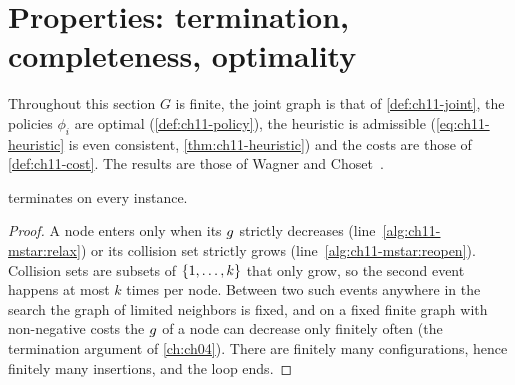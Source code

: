 \section{Properties: termination, completeness, optimality}
\label{sec:ch11-properties}

Throughout this section $G$ is finite, the joint graph is that of
\cref{def:ch11-joint}, the policies $\phi_i$ are optimal
(\cref{def:ch11-policy}), the heuristic is admissible
(\cref{eq:ch11-heuristic} is even consistent, \cref{thm:ch11-heuristic})
and the costs are those of \cref{def:ch11-cost}. The results are those of Wagner and
Choset~\cite{wagner2011mstar,wagner2015subdimensional}.

\begin{theorem}[Termination]
\label{thm:ch11-terminates}
 terminates on every instance.
\end{theorem}
\begin{proof}
A node enters \Open only when its $g$ strictly decreases
(line~\ref{alg:ch11-mstar:relax}) or its collision set strictly grows
(line~\ref{alg:ch11-mstar:reopen}). Collision sets are subsets of
$\left\{ 1,\dots,k \right\}$ that only grow, so the second event happens at most $k$
times per node. Between two such events anywhere in the search the graph
of limited neighbors is fixed, and on a fixed finite graph with
non-negative costs the $g$ of a node can decrease only finitely often
(the termination argument of \cref{ch:ch04}). There are finitely many
configurations, hence finitely many insertions, and the loop ends.
\end{proof}

